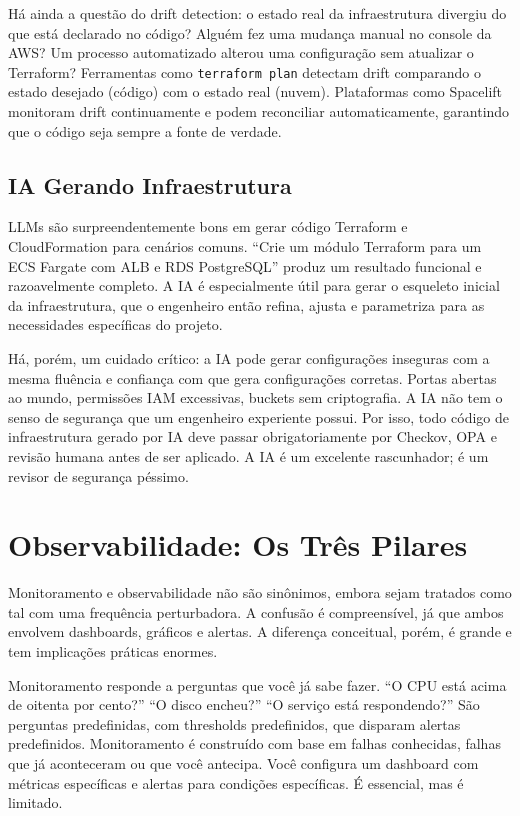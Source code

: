 Há ainda a questão do drift detection: o estado real da infraestrutura divergiu
do que está declarado no código? Alguém fez uma mudança manual no console da AWS?
Um processo automatizado alterou uma configuração sem atualizar o Terraform?
Ferramentas como \texttt{terraform plan} detectam drift comparando o estado
desejado (código) com o estado real (nuvem). Plataformas como Spacelift monitoram
drift continuamente e podem reconciliar automaticamente, garantindo que o código
seja sempre a fonte de verdade.

\subsection{IA Gerando Infraestrutura}

LLMs são surpreendentemente bons em gerar código Terraform e CloudFormation
para cenários comuns. ``Crie um módulo Terraform para um ECS Fargate com ALB
e RDS PostgreSQL'' produz um resultado funcional e razoavelmente completo.
A IA é especialmente útil para gerar o esqueleto inicial da infraestrutura,
que o engenheiro então refina, ajusta e parametriza para as necessidades
específicas do projeto.

Há, porém, um cuidado crítico: a IA pode gerar configurações inseguras com a mesma
fluência e confiança com que gera configurações corretas. Portas abertas ao
mundo, permissões IAM excessivas, buckets sem criptografia. A IA não tem
o senso de segurança que um engenheiro experiente possui. Por isso, todo
código de infraestrutura gerado por IA deve passar obrigatoriamente por
Checkov, OPA e revisão humana antes de ser aplicado. A IA é um excelente
rascunhador; é um revisor de segurança péssimo.

\section{Observabilidade: Os Três Pilares}

Monitoramento e observabilidade não são sinônimos, embora sejam tratados como
tal com uma frequência perturbadora. A confusão é compreensível, já que ambos
envolvem dashboards, gráficos e alertas. A diferença conceitual, porém, é
grande e tem implicações práticas enormes.

Monitoramento responde a perguntas que você já sabe fazer. ``O CPU está acima
de oitenta por cento?'' ``O disco encheu?'' ``O serviço está respondendo?''
São perguntas predefinidas, com thresholds predefinidos, que disparam alertas
predefinidos. Monitoramento é construído com base em falhas conhecidas, falhas
que já aconteceram ou que você antecipa. Você configura um dashboard com
métricas específicas e alertas para condições específicas. É essencial, mas
é limitado.

